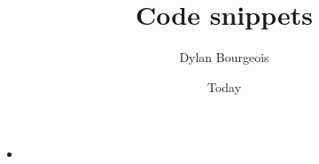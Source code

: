 \documentclass[]{article}
\begin{document}
\title{Code snippets}
\author{Dylan Bourgeois}
\date{Today}
\maketitle

\begin{itemize}
\item \textbf{}
\end{itemize}
\end{document}
